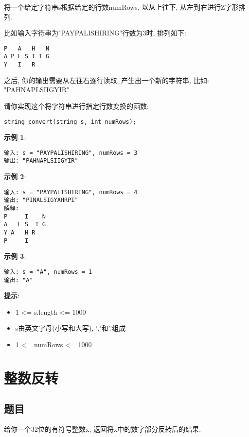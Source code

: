 \documentclass[oneside]{ctexbook}
\begin{document}
将一个给定字符串s根据给定的行数numRows, 以从上往下, 从左到右进行Z字形排列.

比如输入字符串为"PAYPALISHIRING"行数为3时, 排列如下:

\begin{verbatim}
P   A   H   N
A P L S I I G
Y   I   R
\end{verbatim}

之后, 你的输出需要从左往右逐行读取, 产生出一个新的字符串, 比如: "PAHNAPLSIIGYIR".

请你实现这个将字符串进行指定行数变换的函数:

\begin{verbatim}
string convert(string s, int numRows);
\end{verbatim}

\textbf{示例 1}:

\begin{verbatim}
输入: s = "PAYPALISHIRING", numRows = 3
输出: "PAHNAPLSIIGYIR"
\end{verbatim}

\textbf{示例 2}:

\begin{verbatim}
输入: s = "PAYPALISHIRING", numRows = 4
输出: "PINALSIGYAHRPI"
解释:
P     I    N
A   L S  I G
Y A   H R
P     I
\end{verbatim}

\textbf{示例 3}:

\begin{verbatim}
输入: s = "A", numRows = 1
输出: "A"
\end{verbatim}

\textbf{提示}:

\begin{itemize}
    \item 1 <= s.length <= 1000
    \item s由英文字母(小写和大写), ','和'.'组成
    \item 1 <= numRows <= 1000
\end{itemize}

\chapter{整数反转}

\section{题目}

给你一个32位的有符号整数x, 返回将x中的数字部分反转后的结果.
\end{document}
